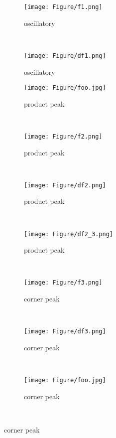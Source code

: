 \begin{figure}
    \centering

    \begin{subfigure}[b]{0.3\textwidth}
        \texttt{[image: Figure/f1.png]}
        \caption{oscillatory}
        \label{fig:f1}
    \end{subfigure}
    ~ %
    \begin{subfigure}[b]{0.3\textwidth}
        \texttt{[image: Figure/df1.png]}
        \caption{oscillatory}
        \label{fig:df1}
    \end{subfigure}
    \begin{subfigure}[b]{0.3\textwidth}
        \texttt{[image: Figure/foo.jpg]}
        \caption{product peak}
        \label{fig:f2}
    \end{subfigure}\\ %


        \begin{subfigure}[b]{0.3\textwidth}
        \texttt{[image: Figure/f2.png]}
        \caption{product peak}
        \label{fig:f2}
    \end{subfigure}
    ~ %
    \begin{subfigure}[b]{0.3\textwidth}
        \texttt{[image: Figure/df2.png]}
        \caption{product peak}
        \label{fig:df2}
    \end{subfigure}
    ~ %
    \begin{subfigure}[b]{0.3\textwidth}
        \texttt{[image: Figure/df2\_3.png]}
        \caption{product peak}
        \label{fig:df2}
    \end{subfigure}\\ %
            \begin{subfigure}[b]{0.3\textwidth}
        \texttt{[image: Figure/f3.png]}
        \caption{corner peak}
        \label{fig:f3}
    \end{subfigure}
    ~ %
    \begin{subfigure}[b]{0.3\textwidth}
        \texttt{[image: Figure/df3.png]}
        \caption{corner peak}
        \label{fig:df3}
    \end{subfigure}
    ~ %
    \begin{subfigure}[b]{0.3\textwidth}
        \texttt{[image: Figure/foo.jpg]}
        \caption{corner peak}
        \label{fig:df3_7}
    \end{subfigure}\\ %



\end{figure}
